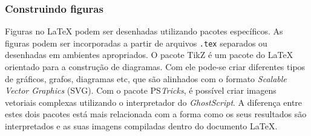 \subsubsection*{Construindo figuras}
\label{sec:const_docs/figs}


Figuras no \LaTeX{} podem ser desenhadas utilizando pacotes específicos. As figuras podem ser incorporadas a partir de arquivos {\tt .tex} separados ou desenhadas em ambientes apropriados. O pacote TikZ é um pacote do \LaTeX{} orientado para a construção de diagramas. Com ele pode-se criar diferentes tipos de gráficos, grafos, diagramas etc, que são alinhados com o formato \textit{Scalable Vector Graphics} (SVG). Com o pacote PS\textit{Tricks}, é possível criar imagens vetoriais complexas utilizando o interpretador do \textit{GhostScript}. A diferença entre estes dois pacotes está mais relacionada com a forma como os seus resultados são interpretados e as suas imagens compiladas dentro do documento \LaTeX{}. %

%
%


